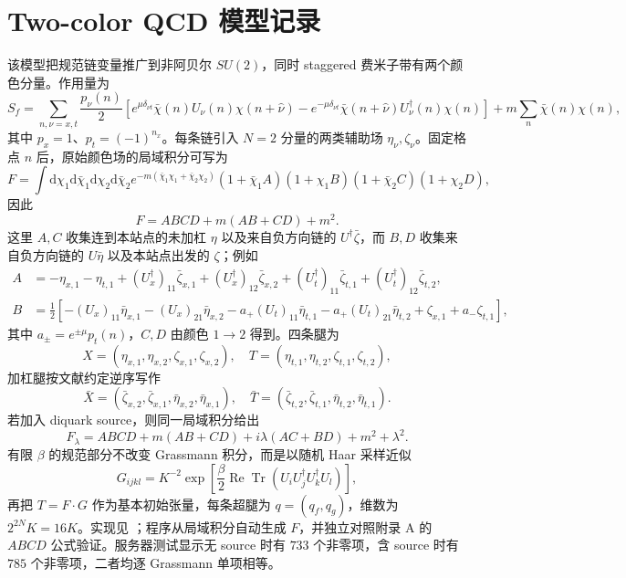 \documentclass[UTF8,11pt]{ctexart}
\newcommand{\dd}{\mathrm{d}}
\begin{document}
\section{Two-color QCD 模型记录}
该模型把规范链变量推广到非阿贝尔 $SU(2)$，同时 staggered 费米子带有两个颜色分量。作用量为
\begin{equation}
 S_f=\sum_{n,\nu=x,t}\frac{p_\nu(n)}2
 \left[e^{\mu\delta_{\nu t}}\bar\chi(n)U_\nu(n)\chi(n+\hat\nu)
 -e^{-\mu\delta_{\nu t}}\bar\chi(n+\hat\nu)U_\nu^\dagger(n)\chi(n)\right]
 +m\sum_n\bar\chi(n)\chi(n),
\end{equation}
其中 $p_x=1$、$p_t=(-1)^{n_x}$。每条链引入 $N=2$ 分量的两类辅助场 $\eta_\nu,\zeta_\nu$。固定格点 $n$ 后，原始颜色场的局域积分可写为
\begin{equation}
 F=\int\dd\chi_1\dd\bar\chi_1\dd\chi_2\dd\bar\chi_2
 e^{-m(\bar\chi_1\chi_1+\bar\chi_2\chi_2)}
 (1+\bar\chi_1A)(1+\chi_1B)(1+\bar\chi_2C)(1+\chi_2D),
\end{equation}
因此
\begin{equation}
 F=ABCD+m(AB+CD)+m^2.
\end{equation}
这里 $A,C$ 收集连到本站点的未加杠 $\eta$ 以及来自负方向链的 $U^\dagger\bar\zeta$，而 $B,D$ 收集来自负方向链的 $U\bar\eta$ 以及本站点出发的 $\zeta$；例如
\begin{align}
 A&=-\eta_{x,1}-\eta_{t,1}+(U_x^\dagger)_{11}\bar\zeta_{x,1}+(U_x^\dagger)_{12}\bar\zeta_{x,2}
 +(U_t^\dagger)_{11}\bar\zeta_{t,1}+(U_t^\dagger)_{12}\bar\zeta_{t,2},\\
 B&=\frac12[-(U_x)_{11}\bar\eta_{x,1}-(U_x)_{21}\bar\eta_{x,2}
 -a_+(U_t)_{11}\bar\eta_{t,1}-a_+(U_t)_{21}\bar\eta_{t,2}
 +\zeta_{x,1}+a_-\zeta_{t,1}],
\end{align}
其中 $a_\pm=e^{\pm\mu}p_t(n)$，$C,D$ 由颜色 $1\to2$ 得到。四条腿为
\begin{equation}
 X=(\eta_{x,1},\eta_{x,2},\zeta_{x,1},\zeta_{x,2}),\quad
 T=(\eta_{t,1},\eta_{t,2},\zeta_{t,1},\zeta_{t,2}),
\end{equation}
加杠腿按文献约定逆序写作
\begin{equation}
 \bar X=(\bar\zeta_{x,2},\bar\zeta_{x,1},\bar\eta_{x,2},\bar\eta_{x,1}),\quad
 \bar T=(\bar\zeta_{t,2},\bar\zeta_{t,1},\bar\eta_{t,2},\bar\eta_{t,1}).
\end{equation}
若加入 diquark source，则同一局域积分给出
\begin{equation}
 F_\lambda=ABCD+m(AB+CD)+i\lambda(AC+BD)+m^2+\lambda^2.
\end{equation}
有限 $\beta$ 的规范部分不改变 Grassmann 积分，而是以随机 Haar 采样近似
\begin{equation}
 G_{ijkl}=K^{-2}\exp\left[\frac{\beta}{2}\operatorname{Re}\operatorname{Tr}
 (U_iU_j^\dagger U_k^\dagger U_l)\right],
\end{equation}
再把 $T=F\cdot G$ 作为基本初始张量，每条超腿为 $q=(q_f,q_g)$，维数为 $2^{2N}K=16K$。实现见 ；程序从局域积分自动生成 $F$，并独立对照附录 A 的 $ABCD$ 公式验证。服务器测试显示无 source 时有 $733$ 个非零项，含 source 时有 $785$ 个非零项，二者均逐 Grassmann 单项相等。
\end{document}
